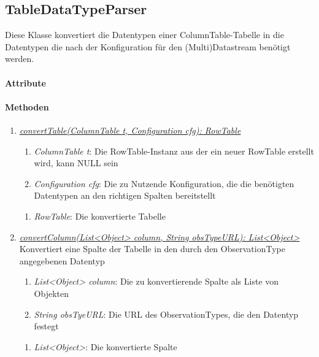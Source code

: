 \subsection*{TableDataTypeParser}\label{tableParser}

Diese Klasse konvertiert die Datentypen einer ColumnTable-Tabelle in die Datentypen die nach der Konfiguration für den (Multi)Datastream benötigt werden.

\paragraph{Attribute}

\paragraph{Methoden}

\begin{enumerate}[+]
	\item \underline{\textit{convertTable(ColumnTable t, Configuration cfg): RowTable}} \\	
	\begin{enumerate}[$\bullet$]
		\item \textit{ColumnTable t}: Die RowTable-Instanz aus der ein neuer RowTable erstellt wird, kann NULL sein
		\item \textit{Configuration cfg}: Die zu Nutzende Konfiguration, die die benötigten Datentypen an den richtigen Spalten bereitstellt
	\end{enumerate}
	\vspace{-0.2cm}
	\begin{enumerate}[$\circ$]
		\item \textit{RowTable}: Die konvertierte Tabelle
	\end{enumerate}

	\item \underline{\textit{convertColumn(List<Object> column, String obsTypeURL): List<Object>}} \\
	Konvertiert eine Spalte der Tabelle in den durch den ObservationType angegebenen Datentyp
	\begin{enumerate}[$\bullet$]
		\item \textit{List<Object> column}: Die zu konvertierende Spalte als Liste von Objekten
		\item \textit{String obsTyeURL}: Die URL des ObservationTypes, die den Datentyp festegt
	\end{enumerate}
	\vspace{-0.2cm}
	\begin{enumerate}[$\circ$]
		\item \textit{List<Object>}: Die konvertierte Spalte
	\end{enumerate}
\end{enumerate}
